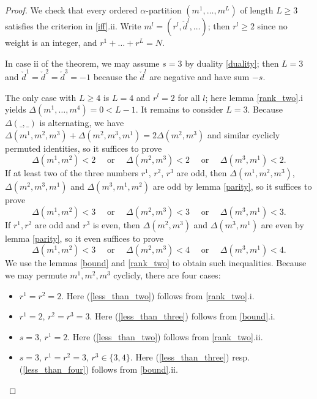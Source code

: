 \documentclass{article}
\begin{document}
\begin{proof}
  We check that every ordered $\alpha$-partition $(m^1, \ldots, m^L)$ of length $L \geq 3$ satisfies the criterion in \ref{iff}.ii. Write $m^l = (r^l,
  \check{d}^l, \ldots)$; then $r^l \geq 2$ since no weight is an integer, and $r^1 + \ldots + r^L = N$.

  In case ii of the theorem, we may assume $s=3$ by duality \ref{duality}; then $L = 3$ and $\check{d}^1 = \check{d}^2 = \check{d}^3 = -1$ because the
  $\check{d}^l$ are negative and have sum $-s$.

  The only case with $L \geq 4$ is $L = 4$ and $r^l = 2$ for all $l$; here lemma \ref{rank_two}.i yields $\Delta(m^1, \ldots, m^4) = 0 < L-1$. It remains
  to consider $L=3$. Because $\Delta(\_, \_)$ is alternating, we have $\Delta(m^1, m^2, m^3) + \Delta(m^2, m^3, m^1) = 2 \Delta(m^2, m^3)$ and similar
  cyclicly permuted identities, so it suffices to prove
  \begin{equation} \label{less_than_two}
    \Delta(m^1, m^2) < 2 \quad \text{ or } \quad \Delta(m^2, m^3) < 2 \quad \text{ or } \quad \Delta(m^3, m^1) < 2.
  \end{equation}
  If at least two of the three numbers $r^1$, $r^2$, $r^3$ are odd, then $\Delta(m^1, m^2, m^3)$, $\Delta(m^2, m^3, m^1)$ and $\Delta(m^3, m^1, m^2)$ are
  odd by lemma \ref{parity}, so it suffices to prove
  \begin{equation} \label{less_than_three}
    \Delta(m^1, m^2) < 3 \quad \text{ or } \quad \Delta(m^2, m^3) < 3 \quad \text{ or } \quad \Delta(m^3, m^1) < 3.
  \end{equation}
  If $r^1, r^2$ are odd and $r^3$ is even, then $\Delta(m^2, m^3)$ and $\Delta(m^3, m^1)$ are even by lemma \ref{parity}, so it even suffices to prove
  \begin{equation} \label{less_than_four}
    \Delta(m^1, m^2) < 3 \quad \text{ or } \quad \Delta(m^2, m^3) < 4 \quad \text{ or } \quad \Delta(m^3, m^1) < 4.
  \end{equation}
  We use the lemmas \ref{bound} and \ref{rank_two} to obtain such inequalities. Because we may permute $m^1, m^2, m^3$ cyclicly, there are four cases:
  \begin{itemize}
   \item[1)] $r^1 = r^2 = 2$. Here (\ref{less_than_two}) follows from \ref{rank_two}.i.
   \item[2)] $r^1 = 2$, $r^2 = r^3 = 3$. Here (\ref{less_than_three}) follows from \ref{bound}.i.
   \item[3)] $s=3$, $r^1 = 2$. Here (\ref{less_than_two}) follows from \ref{rank_two}.ii.
   \item[4)] $s=3$, $r^1 = r^2 = 3$, $r^3 \in \{3, 4\}$. Here (\ref{less_than_three}) resp. (\ref{less_than_four}) follows from \ref{bound}.ii.
  \qedhere \end{itemize}
\end{proof}
\end{document}

